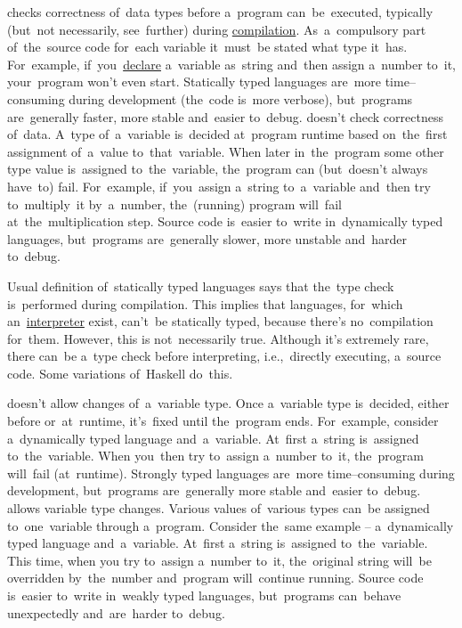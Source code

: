 \begin{itemize}
     checks correctness of~data types before a~program can~be~executed, typically (but~not necessarily, see~further) during \hyperref[compiledinterpretedlanguages]{compilation}.
            As~a~compulsory part of~the~source code for~each variable it~must~be stated what type it~has.
            For~example, if~you~\hyperref[declarationdefinition]{declare} a~variable as~string and~then assign a~number to~it, your~program won't even start.
            Statically typed languages are~more time--consuming during development (the~code is~more verbose), but~programs are~generally faster, more stable and~easier to~debug.
     doesn't check correctness of~data.
            A~type of~a~variable is~decided at~program runtime based on~the~first assignment of~a~value to~that~variable.
            When later in~the~program some other type value is~assigned to~the~variable, the~program can (but~doesn't always have~to) fail.
            For~example, if~you~assign a~string to~a~variable and~then try to~multiply~it by~a~number, the~(running) program will~fail at~the~multiplication step.
            Source code is~easier to~write in~dynamically typed languages, but~programs are~generally slower, more unstable and~harder to~debug.
\end{itemize}

\warningnonl Usual definition of~statically typed languages says that the~type check is~performed during compilation.
This implies that languages, for~which an~\hyperref[compiledinterpretedlanguages]{interpreter} exist, can't~be statically typed, because there's no~compilation for~them.
However, this is not~necessarily true.
Although it's extremely rare, there can~be a~type check before interpreting, i.e.,~directly executing, a~source code.
Some variations of~Haskell do~this.

\begin{itemize}
     doesn't allow changes of~a~variable type.
            Once a~variable type is~decided, either before or~at~runtime, it's~fixed until the~program ends.
            For~example, consider a~dynamically typed language and~a~variable.
            At~first a~string is~assigned to~the~variable.
            When you~then try to~assign a~number to~it, the~program will~fail (at~runtime).
            Strongly typed languages are~more time--consuming during development, but~programs are~generally more stable and~easier to~debug.
     allows variable type changes.
            Various values of~various types can~be assigned to~one~variable through a~program.
            Consider the~same example -- a~dynamically typed language and~a~variable.
            At~first a~string is~assigned to~the~variable.
            This time, when you try to~assign a~number to~it, the~original string will~be overridden by~the~number and~program will~continue running.
            Source code is~easier to~write in~weakly typed languages, but~programs can~behave unexpectedly and~are~harder to~debug.
\end{itemize}

